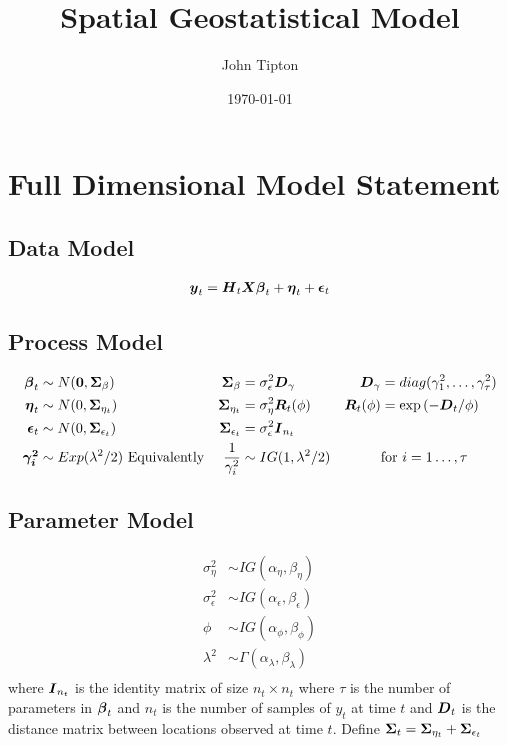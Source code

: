 \documentclass[fleqn]{article}
\title{Spatial Geostatistical Model}
\author{John Tipton}
\date{\today}
\def\bm#1{\mbox{\boldmath $#1$}}
\begin{document}
\maketitle

\section{Full Dimensional Model Statement}
%
\subsection{Data Model}
\begin{align*}
\bm{y}_t & = \bm{H}_t \bm{X} \bm{\beta}_t + \bm{\eta}_t + \bm{\epsilon}_t\\
%
\end{align*}
%
\subsection{Process Model}
%
\begin{align*}
%
\bm{\beta}_t & \sim N(\bm{0}, \bm{\Sigma}_\beta) & \bm{\Sigma}_\beta &  = \sigma^2_\epsilon \bm{D}_\gamma & \bm{D}_\gamma & = diag(\gamma^2_1, \ldots, \gamma^2_\tau)\\
%
\bm{\eta}_t & \sim N(0, \bm{\Sigma}_{\eta_t}) & \bm{\Sigma}_{\eta_t} &  = \sigma^2_\eta \bm{R}_t(\phi) & \bm{R}_t(\phi) & = \exp{( - \bm{D}_t / \phi)}\\
%
\bm{\epsilon}_t & \sim N(0, \bm{\Sigma}_{\epsilon_t}) & \bm{\Sigma}_{\epsilon_t} &  = \sigma^2_\epsilon \bm{I}_{n_t}\\
%
\bm{\gamma^2_i} & \sim Exp(\lambda^2 / 2) \mbox{ Equivalently} & \frac{1} {\gamma^2_i} & \sim IG(1, \lambda^2 / 2) & &  \mbox{for } i =1 \ldots, \tau\\
%
\end{align*}
%
\subsection{Parameter Model}
%
\begin{align*}
%
%
%
\sigma^2_\eta & \sim IG(\alpha_\eta, \beta_\eta)\\
%
\sigma^2_\epsilon & \sim IG(\alpha_\epsilon, \beta_\epsilon)\\
%
\phi & \sim IG(\alpha_\phi, \beta_\phi)\\
%
\lambda^2 & \sim \Gamma(\alpha_\lambda, \beta_\lambda)\\
\end{align*}
%
where $\bm{I}_{n_t}$ is the identity matrix of size $n_t \times n_t$ where $\tau$ is the number of parameters in $\bm{\beta}_t$ and $n_t$ is the number of samples of $y_t$ at time $t$ and $\bm{D}_t$ is the distance matrix between locations observed at time $t$. Define $\bm{\Sigma}_t = \bm{\Sigma}_{\eta_t} + \bm{\Sigma}_{\epsilon_t}$
%
\end{document}
